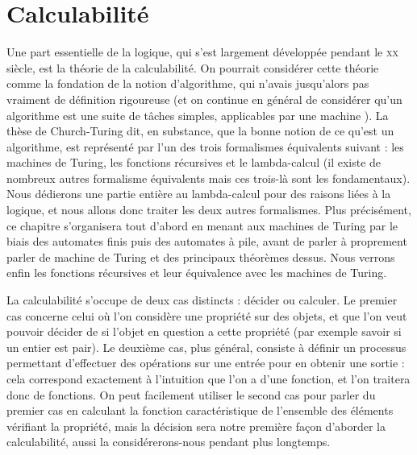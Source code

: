



\chapter{Calculabilité}

Une part essentielle de la logique, qui s'est largement développée pendant le \textsc{xx}\ieme{} siècle, est la théorie de la calculabilité. On pourrait considérer cette théorie comme la fondation de la notion d'algorithme, qui n'avais jusqu'alors pas vraiment de définition rigoureuse (et on continue en général de considérer qu'un algorithme est \og une suite de tâches simples, applicables par une machine \fg{}). La thèse de Church-Turing dit, en substance, que la bonne notion de ce qu'est un algorithme, est représenté par l'un des trois formalismes équivalents suivant : les machines de Turing, les fonctions récursives et le lambda-calcul (il existe de nombreux autres formalisme équivalents mais ces trois-là sont les fondamentaux). Nous dédierons une partie entière au lambda-calcul pour des raisons liées à la logique, et nous allons donc traiter les deux autres formalismes. Plus précisément, ce chapitre s'organisera tout d'abord en menant aux machines de Turing par le biais des automates finis puis des automates à pile, avant de parler à proprement parler de machine de Turing et des principaux théorèmes dessus. Nous verrons enfin les fonctions récursives et leur équivalence avec les machines de Turing.

La calculabilité s'occupe de deux cas distincts : décider ou calculer. Le premier cas concerne celui où l'on considère une propriété sur des objets, et que l'on veut pouvoir décider de si l'objet en question a cette propriété (par exemple savoir si un entier est pair). Le deuxième cas, plus général, consiste à définir un processus permettant d'effectuer des opérations sur une entrée pour en obtenir une sortie : cela correspond exactement à l'intuition que l'on a d'une fonction, et l'on traitera donc de fonctions. On peut facilement utiliser le second cas pour parler du premier cas en calculant la fonction caractéristique de l'ensemble des éléments vérifiant la propriété, mais la décision sera notre première façon d'aborder la calculabilité, aussi la considérerons-nous pendant plus longtemps.



